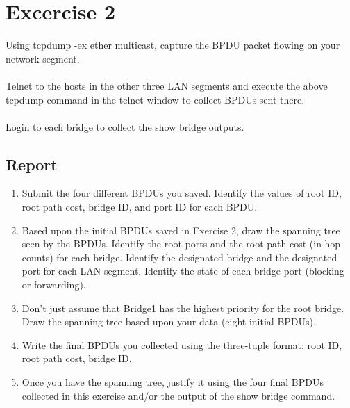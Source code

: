 \documentclass[10pt,a4paper]{article}
\numberwithin{equation}{section}
\numberwithin{figure}{section}
\numberwithin{table}{section}
\begin{document}
\section*{Excercise 2}
   Using tcpdump -ex ether multicast, capture the BPDU packet flowing on your network segment. \\
\\
Telnet to the hosts in the other three LAN segments and execute the above tcpdump command in the telnet window to collect BPDUs sent there. \\
\\
Login to each bridge to collect the show bridge outputs.

    \subsection*{Report}
    \begin{enumerate}
        \item Submit the four different BPDUs you saved. Identify the values of root ID, root path cost, bridge ID, and port ID for each BPDU. 
	    \item Based upon the initial BPDUs saved in Exercise 2, draw the spanning tree seen by the BPDUs. Identify the root ports and the root path cost (in hop counts) for each bridge. Identify the designated bridge and the designated port for each LAN segment. Identify the state of each bridge port (blocking or forwarding). 
        \item Don’t just assume that Bridge1 has the highest priority for the root bridge. Draw the spanning tree based upon your data (eight initial BPDUs). 
        \item Write the final BPDUs you collected using the three-tuple format: {root ID, root path cost, bridge ID}. 
        \item Once you have the spanning tree, justify it using the four final BPDUs collected in this exercise and/or the output of the show bridge command. 
    \end{enumerate}
\end{document}

